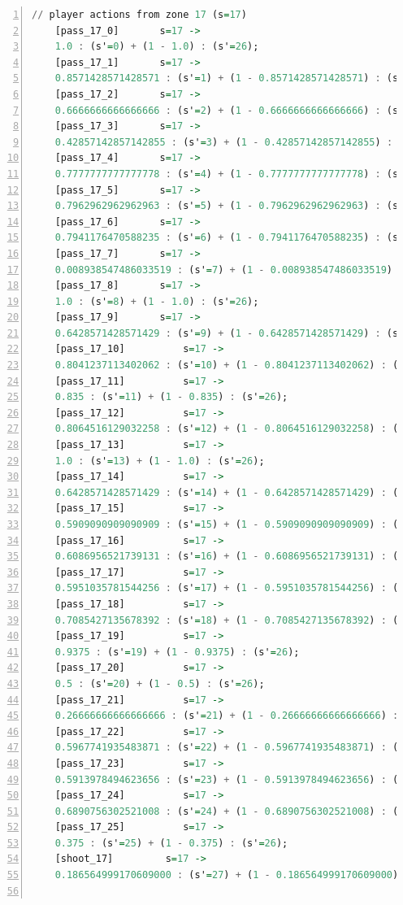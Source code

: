 \documentclass{l4proj}
\begin{document}
\begin{appendices}
\begin{lstlisting}[language=Haskell, numbers=left, caption=MDP used for strategy generation. This is the model specification as-is after the refinements at the end of chapter 3.]
	// player actions from zone 17 (s=17)
	[pass_17_0]	      s=17 ->
	1.0 : (s'=0) + (1 - 1.0) : (s'=26);
	[pass_17_1]	      s=17 ->
	0.8571428571428571 : (s'=1) + (1 - 0.8571428571428571) : (s'=26);
	[pass_17_2]	      s=17 ->
	0.6666666666666666 : (s'=2) + (1 - 0.6666666666666666) : (s'=26);
	[pass_17_3]	      s=17 ->
	0.42857142857142855 : (s'=3) + (1 - 0.42857142857142855) : (s'=26);
	[pass_17_4]	      s=17 ->
	0.7777777777777778 : (s'=4) + (1 - 0.7777777777777778) : (s'=26);
	[pass_17_5]	      s=17 ->
	0.7962962962962963 : (s'=5) + (1 - 0.7962962962962963) : (s'=26);
	[pass_17_6]	      s=17 ->
	0.7941176470588235 : (s'=6) + (1 - 0.7941176470588235) : (s'=26);
	[pass_17_7]	      s=17 ->
	0.008938547486033519 : (s'=7) + (1 - 0.008938547486033519) : (s'=26);
	[pass_17_8]	      s=17 ->
	1.0 : (s'=8) + (1 - 1.0) : (s'=26);
	[pass_17_9]	      s=17 ->
	0.6428571428571429 : (s'=9) + (1 - 0.6428571428571429) : (s'=26);
	[pass_17_10]	      s=17 ->
	0.8041237113402062 : (s'=10) + (1 - 0.8041237113402062) : (s'=26);
	[pass_17_11]	      s=17 ->
	0.835 : (s'=11) + (1 - 0.835) : (s'=26);
	[pass_17_12]	      s=17 ->
	0.8064516129032258 : (s'=12) + (1 - 0.8064516129032258) : (s'=26);
	[pass_17_13]	      s=17 ->
	1.0 : (s'=13) + (1 - 1.0) : (s'=26);
	[pass_17_14]	      s=17 ->
	0.6428571428571429 : (s'=14) + (1 - 0.6428571428571429) : (s'=26);
	[pass_17_15]	      s=17 ->
	0.5909090909090909 : (s'=15) + (1 - 0.5909090909090909) : (s'=26);
	[pass_17_16]	      s=17 ->
	0.6086956521739131 : (s'=16) + (1 - 0.6086956521739131) : (s'=26);
	[pass_17_17]	      s=17 ->
	0.5951035781544256 : (s'=17) + (1 - 0.5951035781544256) : (s'=26);
	[pass_17_18]	      s=17 ->
	0.7085427135678392 : (s'=18) + (1 - 0.7085427135678392) : (s'=26);
	[pass_17_19]	      s=17 ->
	0.9375 : (s'=19) + (1 - 0.9375) : (s'=26);
	[pass_17_20]	      s=17 ->
	0.5 : (s'=20) + (1 - 0.5) : (s'=26);
	[pass_17_21]	      s=17 ->
	0.26666666666666666 : (s'=21) + (1 - 0.26666666666666666) : (s'=26);
	[pass_17_22]	      s=17 ->
	0.5967741935483871 : (s'=22) + (1 - 0.5967741935483871) : (s'=26);
	[pass_17_23]	      s=17 ->
	0.5913978494623656 : (s'=23) + (1 - 0.5913978494623656) : (s'=26);
	[pass_17_24]	      s=17 ->
	0.6890756302521008 : (s'=24) + (1 - 0.6890756302521008) : (s'=26);
	[pass_17_25]	      s=17 ->
	0.375 : (s'=25) + (1 - 0.375) : (s'=26);
	[shoot_17]	       s=17 ->
	0.186564999170609000 : (s'=27) + (1 - 0.186564999170609000) : (s'=26);


\end{lstlisting}
\end{appendices}
\end{document}
